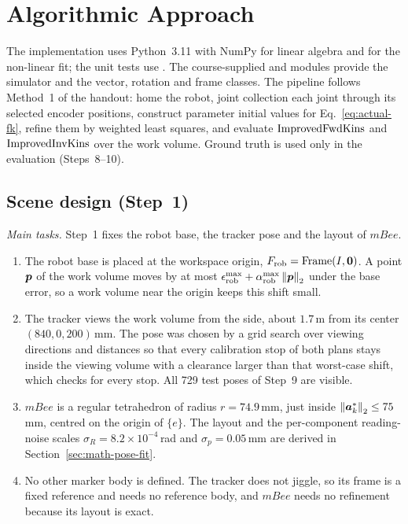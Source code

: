 \documentclass[../main.tex]{subfiles}
\begin{document}
\section{Algorithmic Approach}\label{sec:algorithm}
The implementation uses Python~3.11 with NumPy for linear algebra and  for the non-linear fit; the unit tests use . The course-supplied  and  modules provide the simulator and the vector, rotation and frame classes. The pipeline follows Method~1 of the handout: home the robot, joint collection each joint through its selected encoder positions, construct parameter initial values for Eq.~\eqref{eq:actual-fk}, refine them by weighted least squares, and evaluate $\operatorname{ImprovedFwdKins}$ and $\operatorname{ImprovedInvKins}$ over the work volume. Ground truth is used only in the evaluation (Steps~8--10).

\subsection{Scene design (Step~1)}\label{sec:alg-scene}
\noindent\textit{Main tasks.} Step~1 fixes the robot base, the tracker pose and the layout of $mBee$.
\begin{enumerate}
\renewcommand{\labelenumi}{\roman{enumi}.}
\item The robot base is placed at the workspace origin, $F_{\mathrm{rob}}=\operatorname{Frame}(I,\bm{0})$. A point $\bm{p}$ of the work volume moves by at most $\epsilon^{\max}_{\mathrm{rob}}+\alpha^{\max}_{\mathrm{rob}}\left\|\bm{p}\right\|_2$ under the base error, so a work volume near the origin keeps this shift small.
\item The tracker views the work volume from the side, about $1.7$\,m from its center $(840,0,200)$\,mm. The pose was chosen by a grid search over viewing directions and distances so that every calibration stop of both plans stays inside the viewing volume with a clearance larger than that worst-case shift, which  checks for every stop. All 729 test poses of Step~9 are visible.
\item $mBee$ is a regular tetrahedron of radius $r=74.9$\,mm, just inside $\left\|\bm{a}^*_k\right\|_2\leq75$\,mm, centred on the origin of $\{e\}$. The layout and the per-component reading-noise scales $\sigma_R=8.2\times10^{-4}$\,rad and $\sigma_p=0.05$\,mm are derived in Section~\ref{sec:math-pose-fit}.
\item No other marker body is defined. The tracker does not jiggle, so its frame is a fixed reference and needs no reference body, and $mBee$ needs no refinement because its layout is exact.
\end{enumerate}
\end{document}
